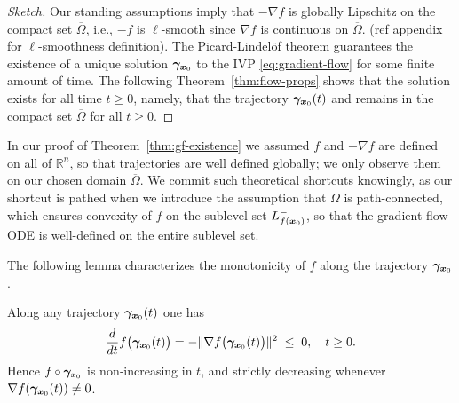 \documentclass[10pt]{article}
\begin{document}
        \begin{proof}[Sketch]
            Our standing assumptions imply that $-\nabla f$ is globally Lipschitz on the compact set $\overline{\Omega}$,
            i.e., $-f$ is $\ell$-smooth since $\nabla f$ is continuous on $\overline{\Omega}$. (ref appendix for
            $\ell$-smoothness definition). The Picard-Lindelöf theorem guarantees the existence of a unique
            solution $\bm{\gamma}_{\bm{x}_0}$ to the IVP \eqref{eq:gradient-flow} for some finite amount of time.
            The following Theorem~\ref{thm:flow-props} shows that the solution exists for all time $t\ge0$,
            namely, that the trajectory $\bm{\gamma}_{\bm{x}_0}(t)$ and remains in the compact set $\overline{\Omega}$ for all $t\ge0$.
        \end{proof}

        \begin{remark}
            In our proof of Theorem~\ref{thm:gf-existence} we assumed $f$ and $-\nabla f$ are defined 
            on all of $\mathbb R^n$, so that trajectories are well defined globally; we only 
            observe them on our chosen domain $\overline\Omega$. 
            We commit such theoretical shortcuts knowingly, as our shortcut is pathed when we introduce the
            assumption that $\Omega$ is path-connected, which ensures convexity of $f$ on the sublevel set
            $L_{f(\bm{x}_0)}^-$, so that the gradient flow ODE is well-defined on the entire sublevel set.
        \end{remark}

        The following lemma characterizes the monotonicity of $f$ along the trajectory $\bm{\gamma}_{\bm{x}_0}$.

        \begin{lemma}\label{lem:monotone-flow}
            Along any trajectory $\bm{\gamma}_{\bm{x}_0}(t)$ one has
            \begin{equation}\label{eq:monotone-flow}
                \frac{d}{dt}f\bigl(\bm{\gamma}_{\bm{x}_0}(t)\bigr) = -\|\nabla f\bigl(\bm{\gamma}_{\bm{x}_0}(t)\bigr)\|^{2}\;\le\;0, \quad t \ge 0.
            \end{equation}
            Hence $f\circ\bm{\gamma}_{x_0}$ is non‐increasing in $t$, and strictly decreasing whenever $\nabla f(\bm{\gamma}_{\bm{x}_0}(t))\neq0$.
        \end{lemma}
\end{document}
